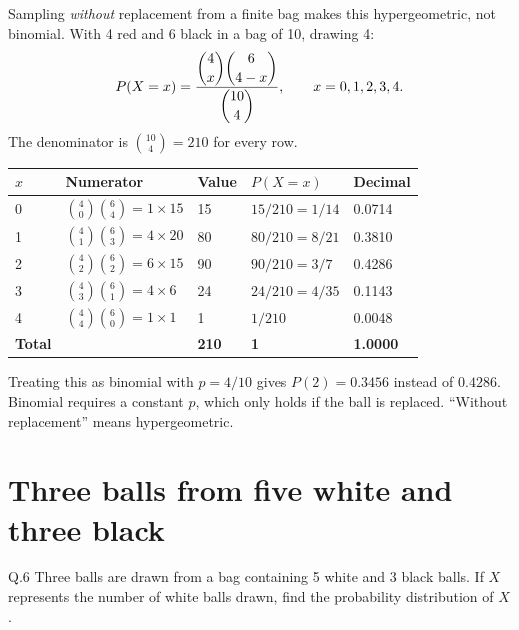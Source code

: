 \begin{solution}
Sampling \emph{without} replacement from a finite bag makes this hypergeometric,
not binomial. With 4 red and 6 black in a bag of 10, drawing 4:
\[
P(X=x)=\frac{\dbinom{4}{x}\dbinom{6}{4-x}}{\dbinom{10}{4}},\qquad x=0,1,2,3,4 .
\]
The denominator is $\binom{10}{4}=210$ for every row.

\begin{center}
\small\sffamily
\begin{tabular}{@{}C{1.4cm} L{4.6cm} C{2.0cm} C{2.2cm} C{1.8cm}@{}}
\toprule
$x$ & Numerator & Value & $P(X=x)$ & Decimal \\
 & $\binom{4}{0}\binom{6}{4}=1\times 15$ & 15 & $15/210=1/14$   & 0.0714 \\
1 & $\binom{4}{1}\binom{6}{3}=4\times 20$ & 80 & $80/210=8/21$   & 0.3810 \\
2 & $\binom{4}{2}\binom{6}{2}=6\times 15$ & 90 & $90/210=3/7$    & 0.4286 \\
3 & $\binom{4}{3}\binom{6}{1}=4\times 6$  & 24 & $24/210=4/35$   & 0.1143 \\
4 & $\binom{4}{4}\binom{6}{0}=1\times 1$  & 1  & $1/210$         & 0.0048 \\
\midrule
\textbf{Total} & & \textbf{210} & \textbf{1} & \textbf{1.0000} \\
\bottomrule
\end{tabular}
\end{center}


\end{solution}

\begin{pitfall}
Treating this as binomial with $p=4/10$ gives $P(2)=0.3456$ instead of
$0.4286$. Binomial requires a constant $p$, which only holds if the ball is
replaced. ``Without replacement'' means hypergeometric.
\end{pitfall}

\section{Three balls from five white and three black}

\begin{question}{Q.6}
Three balls are drawn from a bag containing 5 white and 3 black balls. If $X$
represents the number of white balls drawn, find the probability distribution of
$X$.
\end{question}

